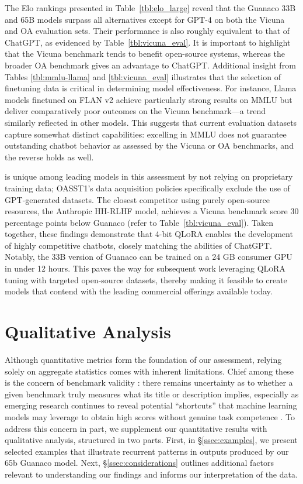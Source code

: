 The Elo rankings presented in Table~\ref{tbl:elo_large} reveal that the {Guanaco} 33B and 65B models surpass all alternatives except for GPT-4 on both the Vicuna and OA evaluation sets. Their performance is also roughly equivalent to that of ChatGPT, as evidenced by Table~\ref{tbl:vicuna_eval}. It is important to highlight that the Vicuna benchmark tends to benefit open-source systems, whereas the broader OA benchmark gives an advantage to ChatGPT. Additional insight from Tables \ref{tbl:mmlu-llama} and \ref{tbl:vicuna_eval} illustrates that the selection of finetuning data is critical in determining model effectiveness. For instance, Llama models finetuned on FLAN v2 achieve particularly strong results on MMLU but deliver comparatively poor outcomes on the Vicuna benchmark—a trend similarly reflected in other models. This suggests that current evaluation datasets capture somewhat distinct capabilities: excelling in MMLU does not guarantee outstanding chatbot behavior as assessed by the Vicuna or OA benchmarks, and the reverse holds as well.

is unique among leading models in this assessment by not relying on proprietary training data; OASST1’s data acquisition policies specifically exclude the use of GPT-generated datasets. The closest competitor using purely open-source resources, the Anthropic HH-RLHF model, achieves a Vicuna benchmark score 30 percentage points below {Guanaco} (refer to Table~\ref{tbl:vicuna_eval}). Taken together, these findings demonstrate that 4-bit \textsc{QLoRA} enables the development of highly competitive chatbots, closely matching the abilities of ChatGPT. Notably, the 33B version of {Guanaco} can be trained on a 24 GB consumer GPU in under 12 hours. This paves the way for subsequent work leveraging \textsc{QLoRA} tuning with targeted open-source datasets, thereby making it feasible to create models that contend with the leading commercial offerings available today.

\section{Qualitative Analysis}

Although quantitative metrics form the foundation of our assessment, relying solely on aggregate statistics comes with inherent limitations. Chief among these is the concern of benchmark validity \citep{liao2021we}: there remains uncertainty as to whether a given benchmark truly measures what its title or description implies, especially as emerging research continues to reveal potential ``shortcuts'' that machine learning models may leverage to obtain high scores without genuine task competence \citep{gururangan2018annotation, poliak2018hypothesis}. To address this concern in part, we supplement our quantitative results with qualitative analysis, structured in two parts. First, in \S\ref{ssec:examples}, we present selected examples that illustrate recurrent patterns in outputs produced by our 65b {Guanaco} model. Next, \S\ref{ssec:considerations} outlines additional factors relevant to understanding our findings and informs our interpretation of the data.

